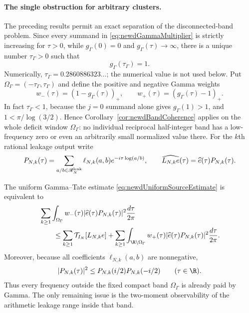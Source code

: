 \paragraph{The single obstruction for arbitrary clusters.}
The preceding results permit an exact separation of the disconnected-band
problem.  Since every summand in \eqref{eq:newdGammaMultiplier} is strictly
increasing for $\tau>0$, while $g_\Gamma(0)=0$ and
$g_\Gamma(\tau)\to\infty$, there is a unique number
$\tau_\Gamma>0$ such that
\begin{equation}\label{eq:newdGammaCutoff}
 g_\Gamma(\tau_\Gamma)=1.
\end{equation}
Numerically, $\tau_\Gamma=0.2860886323\ldots$; the numerical value is not
used below.  Put $\Omega_\Gamma=(-\tau_\Gamma,\tau_\Gamma)$ and define the
positive and negative Gamma weights
\[
 w_-(\tau)=(1-g_\Gamma(\tau))_+,
 \qquad
 w_+(\tau)=(g_\Gamma(\tau)-1)_+.
\]
In fact $\tau_\Gamma<1$, because the $j=0$ summand alone gives
$g_\Gamma(1)>1$, and $1<\pi/\log(3/2)$.  Hence
Corollary~\ref{cor:newdBandCoherence} applies on the whole deficit window
$\Omega_\Gamma$: no individual reciprocal half-integer band has a
low-frequency zero or even an arbitrarily small normalized value there.
For the $k$th rational leakage output write
\begin{equation}\label{eq:newdLeakagePolynomial}
 P_{N,k}(\tau)=
 \sum_{a/b\in\mathscr R_N^{\rm leak}}
 \ell_{N,k}(a,b)e^{-i\tau\log(a/b)},
 \qquad
 \widehat{L_{N,k}e}(\tau)=\widehat e(\tau)P_{N,k}(\tau).
\end{equation}

\begin{proposition}
\label{prop:newdLowFrequencyReduction}
The uniform Gamma--Tate estimate
\eqref{eq:newdUniformSourceEstimate} is equivalent to
\begin{align}
 &\sum_{k\geq1}\int_{\Omega_\Gamma}
    w_-(\tau)|\widehat e(\tau)P_{N,k}(\tau)|^2
       \frac{d\tau}{2\pi}                                \notag\\
 &\qquad\leq
 \sum_{k\geq1}\mathcal T_{I_N}[L_{N,k}e]
 +\sum_{k\geq1}\int_{\R\setminus\Omega_\Gamma}
    w_+(\tau)|\widehat e(\tau)P_{N,k}(\tau)|^2
       \frac{d\tau}{2\pi}.                               
 \label{eq:newdLowFrequencyObservability}
\end{align}
Moreover, because all coefficients
$\ell_{N,k}(a,b)$ are nonnegative,
\begin{equation}\label{eq:newdPositiveCoefficientEnvelope}
 |P_{N,k}(\tau)|^2
 \leq P_{N,k}(i/2)P_{N,k}(-i/2)
 \qquad(\tau\in\R).
\end{equation}
Thus every frequency outside the fixed compact band
$\Omega_\Gamma$ is already paid by Gamma.  The only remaining issue is the
two-moment observability of the arithmetic leakage range inside that band.
\end{proposition}

